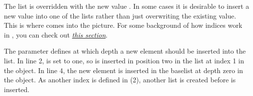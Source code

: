 \documentclass[a4paper,10pt,english]{sphinxmanual}
\begin{document}
\sphinxAtStartPar
The list \sphinxcode{\sphinxupquote{{[}5, 6{]}}} is overridden with the new value . In some cases it is desirable to insert a new value into one of the lists rather than just overwriting the existing value. This is where  comes into the picture. For some background of how \sphinxhyphen{}indices work in , you can check out {\hyperref[\detokenize{README:correctly-handling-list-indices}]{\emph{this section}}}.

\begin{sphinxVerbatim}[commandchars=\\\{\},numbers=left,firstnumber=1,stepnumber=1]
  \PYG{p}{[} \PYG{p}{[}  \PYG{p}{[} \PYG{p}{]} \PYG{p}{]}\PYG{p}{]} 
     
     
\end{sphinxVerbatim}

\sphinxAtStartPar
The parameter  defines at which depth a new element should be inserted into the list. In line 2,  is set to one, so  is inserted in position two in the list at index 1 in the \sphinxhyphen{}object. In line 4, the new element is inserted in the base\sphinxhyphen{}list at depth zero in the \sphinxhyphen{}object. As another index is defined in  (2), another list is created before  is inserted.
\end{document}
